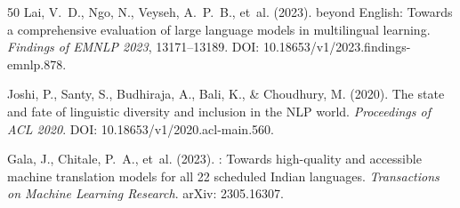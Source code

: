 \documentclass[11pt,a4paper]{article}
\begin{document}
\begin{thebibliography}{50}
Lai, V.~D., Ngo, N., Veyseh, A.~P.~B., et~al. (2023).
 beyond {English}: Towards a comprehensive evaluation of large language models in multilingual learning.
\newblock \emph{Findings of EMNLP 2023}, 13171--13189.
\newblock DOI: 10.18653/v1/2023.findings-emnlp.878.

Joshi, P., Santy, S., Budhiraja, A., Bali, K., \& Choudhury, M. (2020).
\newblock The state and fate of linguistic diversity and inclusion in the {NLP} world.
\newblock \emph{Proceedings of ACL 2020}.
\newblock DOI: 10.18653/v1/2020.acl-main.560.

Gala, J., Chitale, P.~A., et~al. (2023).
: Towards high-quality and accessible machine translation models for all 22 scheduled {Indian} languages.
\newblock \emph{Transactions on Machine Learning Research}.
\newblock arXiv: 2305.16307.

\end{thebibliography}
\end{document}
